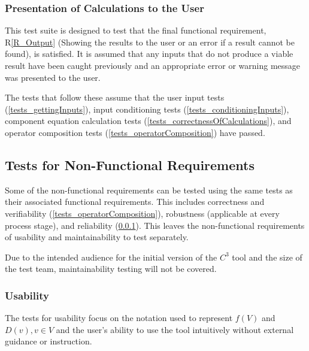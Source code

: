 \documentclass[12pt, titlepage]{article}
\newcommand{\rref}[1]{R\ref{#1}}
\newcommand{\prognameAbbrv}{$C^{3}$}
\begin{document}
\subsubsection{Presentation of Calculations to the User}
\label{tests_outputResults}
This test suite is designed to test that the final functional requirement, 
\rref{R_Output} (Showing the results to the user or an error if a result cannot 
be found), is satisfied. It is assumed that any 
inputs that do not produce a viable result have been caught previously and an 
appropriate error or warning message was presented to the user.

The tests that follow these assume that the user input tests 
(\ref{tests_gettingInputs}), input conditioning tests 
(\ref{tests_conditioningInputs}), component equation calculation tests 
(\ref{tests_correctnessOfCalculations}), and operator composition tests 
(\ref{tests_operatorComposition}) have passed.



\subsection{Tests for Non-Functional Requirements}
\label{testplan_nonfunctional}

Some of the non-functional requirements can be tested using the same tests as 
their associated functional requirements. This includes correctness 
and verifiability (\ref{tests_operatorComposition}), robustness (applicable at 
every process stage), and reliability (\ref{tests_outputResults}). This leaves 
the non-functional requirements of usability and maintainability to test 
separately. 

Due to the intended audience for the initial version of the \prognameAbbrv{} 
tool and the size of the test team, maintainability testing will not be covered.

\subsubsection{Usability}
\label{tests_nonfunctional_usability}
The tests for usability focus on the notation used to represent $f(V)$ and 
$D(v), v \in V$ and the user's ability to use the tool intuitively without 
external guidance or instruction.
		
\end{document}
